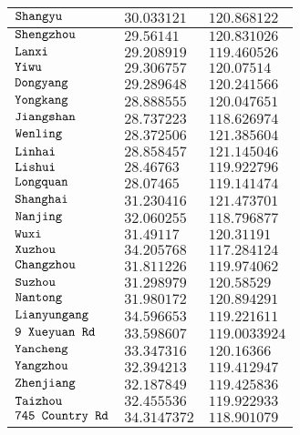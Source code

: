 \begin{longtable}{|l||l|l|}
$\text{\texttt{Shangyu}}$ & $30.033121$ & $120.868122$ \\ \hline
$\text{\texttt{Shengzhou}}$ & $29.56141$ & $120.831026$ \\ \hline
$\text{\texttt{Lanxi}}$ & $29.208919$ & $119.460526$ \\ \hline
$\text{\texttt{Yiwu}}$ & $29.306757$ & $120.07514$ \\ \hline
$\text{\texttt{Dongyang}}$ & $29.289648$ & $120.241566$ \\ \hline
$\text{\texttt{Yongkang}}$ & $28.888555$ & $120.047651$ \\ \hline
$\text{\texttt{Jiangshan}}$ & $28.737223$ & $118.626974$ \\ \hline
$\text{\texttt{Wenling}}$ & $28.372506$ & $121.385604$ \\ \hline
$\text{\texttt{Linhai}}$ & $28.858457$ & $121.145046$ \\ \hline
$\text{\texttt{Lishui}}$ & $28.46763$ & $119.922796$ \\ \hline
$\text{\texttt{Longquan}}$ & $28.07465$ & $119.141474$ \\ \hline
$\text{\texttt{Shanghai}}$ & $31.230416$ & $121.473701$ \\ \hline
$\text{\texttt{Nanjing}}$ & $32.060255$ & $118.796877$ \\ \hline
$\text{\texttt{Wuxi}}$ & $31.49117$ & $120.31191$ \\ \hline
$\text{\texttt{Xuzhou}}$ & $34.205768$ & $117.284124$ \\ \hline
$\text{\texttt{Changzhou}}$ & $31.811226$ & $119.974062$ \\ \hline
$\text{\texttt{Suzhou}}$ & $31.298979$ & $120.58529$ \\ \hline
$\text{\texttt{Nantong}}$ & $31.980172$ & $120.894291$ \\ \hline
$\text{\texttt{Lianyungang}}$ & $34.596653$ & $119.221611$ \\ \hline
$\text{\texttt{9{ }Xueyuan{ }Rd}}$ & $33.598607$ & $119.0033924$ \\ \hline
$\text{\texttt{Yancheng}}$ & $33.347316$ & $120.16366$ \\ \hline
$\text{\texttt{Yangzhou}}$ & $32.394213$ & $119.412947$ \\ \hline
$\text{\texttt{Zhenjiang}}$ & $32.187849$ & $119.425836$ \\ \hline
$\text{\texttt{Taizhou}}$ & $32.455536$ & $119.922933$ \\ \hline
$\text{\texttt{745{ }Country{ }Rd}}$ & $34.3147372$ & $118.901079$ \\ \hline
\end{longtable}